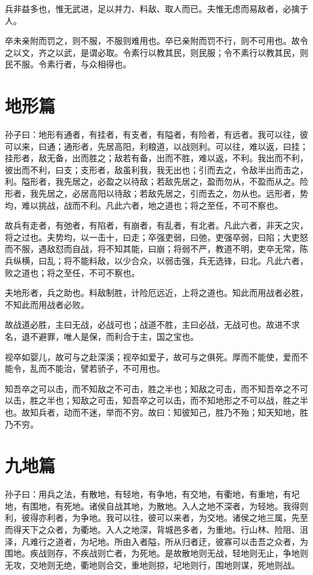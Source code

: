 \documentclass[UTF8]{ctexart}
\begin{document}
	兵非益多也，惟无武进，足以并力、料敌、取人而已。夫惟无虑而易敌者，必擒于人。
	
	卒未亲附而罚之，则不服，不服则难用也。卒已亲附而罚不行，则不可用也。故令之以文，齐之以武，是谓必取。令素行以教其民，则民服；令不素行以教其民，则民不服。令素行者，与众相得也。
	
	\newpage
	\section{地形篇}
	
	孙子曰：地形有通者，有挂者，有支者，有隘者，有险者，有远者。我可以往，彼可以来，曰通；通形者，先居高阳，利粮道，以战则利。可以往，难以返，曰挂；挂形者，敌无备，出而胜之；敌若有备，出而不胜，难以返，不利。我出而不利，彼出而不利，曰支；支形者，敌虽利我，我无出也；引而去之，令敌半出而击之，利。隘形者，我先居之，必盈之以待敌；若敌先居之，盈而勿从，不盈而从之。险形者，我先居之，必居高阳以待敌；若敌先居之，引而去之，勿从也。远形者，势均，难以挑战，战而不利。凡此六者，地之道也；将之至任，不可不察也。
	
	故兵有走者，有弛者，有陷者，有崩者，有乱者，有北者。凡此六者，非天之灾，将之过也。夫势均，以一击十，曰走；卒强吏弱，曰弛，吏强卒弱，曰陷；大吏怒而不服，遇敌怼而自战，将不知其能，曰崩；将弱不严，教道不明，吏卒无常，陈兵纵横，曰乱；将不能料敌，以少合众，以弱击强，兵无选锋，曰北。凡此六者，败之道也；将之至任，不可不察也。
	
	夫地形者，兵之助也。料敌制胜，计险厄远近，上将之道也。知此而用战者必胜，不知此而用战者必败。
	
	故战道必胜，主曰无战，必战可也；战道不胜，主曰必战，无战可也。故进不求名，退不避罪，唯人是保，而利合于主，国之宝也。
	
	视卒如婴儿，故可与之赴深溪；视卒如爱子，故可与之俱死。厚而不能使，爱而不能令，乱而不能治，譬若骄子，不可用也。
	
	知吾卒之可以击，而不知敌之不可击，胜之半也；知敌之可击，而不知吾卒之不可以击，胜之半也；知敌之可击，知吾卒之可以击，而不知地形之不可以战，胜之半也。故知兵者，动而不迷，举而不穷。故曰：知彼知己，胜乃不殆；知天知地，胜乃不穷。
	
	\newpage
	\section{九地篇}
	
	孙子曰：用兵之法，有散地，有轻地，有争地，有交地，有衢地，有重地，有圮地，有围地，有死地。诸侯自战其地，为散地。入人之地不深者，为轻地。我得则利，彼得亦利者，为争地。我可以往，彼可以来者，为交地。诸侯之地三属，先至而得天下之众者，为衢地。入人之地深，背城邑多者，为重地。行山林、险阻、沮泽，凡难行之道者，为圮地。所由入者隘，所从归者迂，彼寡可以击吾之众者，为围地。疾战则存，不疾战则亡者，为死地。是故散地则无战，轻地则无止，争地则无攻，交地则无绝，衢地则合交，重地则掠，圮地则行，围地则谋，死地则战。
	
\end{document}
